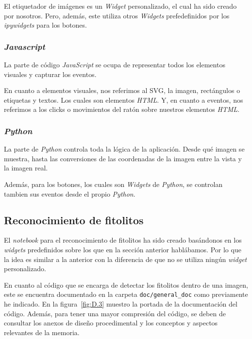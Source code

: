 El etiquetador de imágenes es un \textit{Widget} personalizado, el cual ha sido creado por nosotros. Pero, además, este utiliza otros \textit{Widgets} prefedefinidos por los \textit{ipywidgets} para los botones.

\subsubsection{\textit{Javascript}}

La parte de código \textit{JavaScript} se ocupa de representar todos los elementos visuales y capturar los eventos.

En cuanto a elementos visuales, nos referimos al SVG, la imagen, rectángulos o etiquetas y textos. Los cuales son elementos \textit{HTML}. Y, en cuanto a eventos, nos referimos a los clicks o movimientos del ratón sobre nuestros elementos \textit{HTML}.

\subsubsection{\textit{Python}}

La parte de \textit{Python} controla toda la lógica de la aplicación. Desde qué imagen se muestra, hasta las conversiones de las coordenadas de la imagen entre la vista y la imagen real.

Además, para los botones, los cuales son \textit{Widgets} de \textit{Python}, se controlan tambien sus eventos desde el propio \textit{Python}.

\subsection{Reconocimiento de fitolitos}

El \textit{notebook} para el reconocimiento de fitolitos ha sido creado basándonos en los \textit{widgets} predefinidos sobre los que en la sección anterior hablábamos. Por lo que la idea es similar a la anterior con la diferencia de que no se utiliza ningún \textit{widget} personalizado.

En cuanto al código que se encarga de detectar los fitolitos dentro de una imagen, este se encuentra documentado en la carpeta \texttt{doc/general\_doc} como previamente he indicado. En la figura~\ref{fig:D.3} muestro la portada de la documentación del código. Además, para tener una mayor compresión del código, se deben de consultar los anexos de diseño procedimental y los conceptos y aspectos relevantes de la memoria.

